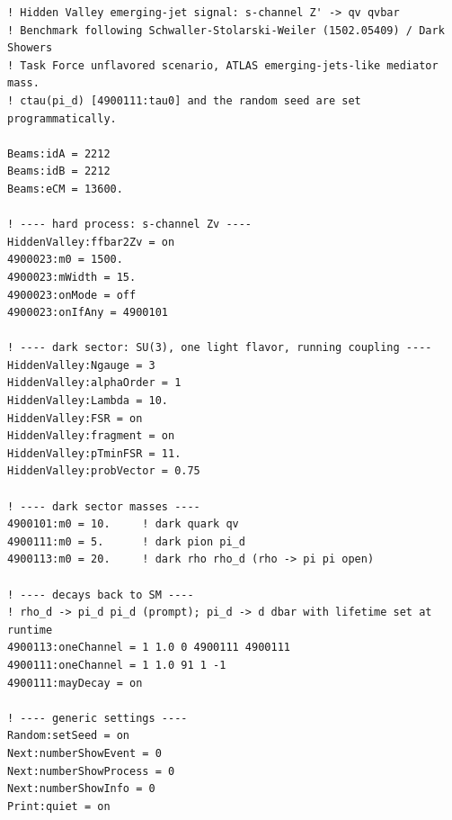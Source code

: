 \documentclass[a4paper,11pt]{article}
\begin{document}
{\small
\begin{verbatim}
! Hidden Valley emerging-jet signal: s-channel Z' -> qv qvbar
! Benchmark following Schwaller-Stolarski-Weiler (1502.05409) / Dark Showers
! Task Force unflavored scenario, ATLAS emerging-jets-like mediator mass.
! ctau(pi_d) [4900111:tau0] and the random seed are set programmatically.

Beams:idA = 2212
Beams:idB = 2212
Beams:eCM = 13600.

! ---- hard process: s-channel Zv ----
HiddenValley:ffbar2Zv = on
4900023:m0 = 1500.
4900023:mWidth = 15.
4900023:onMode = off
4900023:onIfAny = 4900101

! ---- dark sector: SU(3), one light flavor, running coupling ----
HiddenValley:Ngauge = 3
HiddenValley:alphaOrder = 1
HiddenValley:Lambda = 10.
HiddenValley:FSR = on
HiddenValley:fragment = on
HiddenValley:pTminFSR = 11.
HiddenValley:probVector = 0.75

! ---- dark sector masses ----
4900101:m0 = 10.     ! dark quark qv
4900111:m0 = 5.      ! dark pion pi_d
4900113:m0 = 20.     ! dark rho rho_d (rho -> pi pi open)

! ---- decays back to SM ----
! rho_d -> pi_d pi_d (prompt); pi_d -> d dbar with lifetime set at runtime
4900113:oneChannel = 1 1.0 0 4900111 4900111
4900111:oneChannel = 1 1.0 91 1 -1
4900111:mayDecay = on

! ---- generic settings ----
Random:setSeed = on
Next:numberShowEvent = 0
Next:numberShowProcess = 0
Next:numberShowInfo = 0
Print:quiet = on
\end{verbatim}
}
\end{document}
